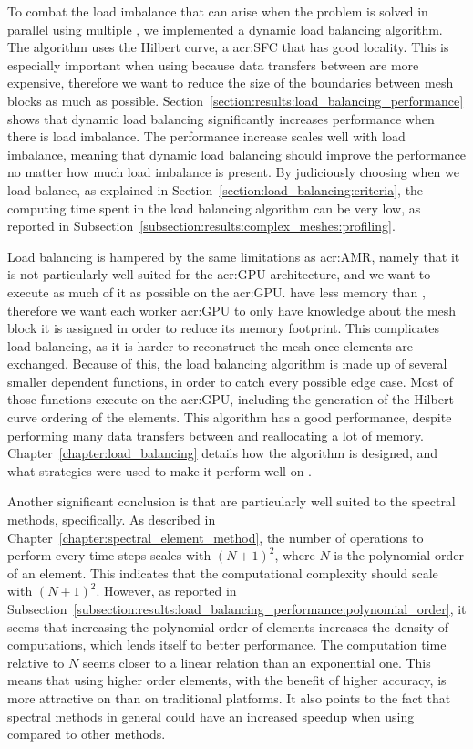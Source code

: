 To combat the load imbalance that can arise when the problem is solved in parallel using multiple
, we implemented a dynamic load balancing algorithm. The algorithm uses the
Hilbert curve, a \acrlong{acr:SFC} that has good locality. This is especially important when using
 because data transfers between  are more expensive,
therefore we want to reduce the size of the boundaries between mesh blocks as much as possible.
Section~\ref{section:results:load_balancing_performance} shows that dynamic load balancing
significantly increases performance when there is load imbalance. The performance increase scales
well with load imbalance, meaning that dynamic load balancing should improve the performance no
matter how much load imbalance is present. By judiciously choosing when we load balance, as
explained in Section~\ref{section:load_balancing:criteria}, the computing time spent in the load
balancing algorithm can be very low, as reported in
Subsection~\ref{subsection:results:complex_meshes:profiling}. 

Load balancing is hampered  by the same limitations as \acrshort{acr:AMR}, namely that it is not
particularly well suited for the \acrshort{acr:GPU} architecture, and we want to execute as much of
it as possible on the \acrshort{acr:GPU}.  have less memory than
, therefore we want each worker \acrshort{acr:GPU} to only have knowledge about
the mesh block it is assigned in order to reduce its memory footprint. This complicates load
balancing, as it is harder to reconstruct the mesh once elements are exchanged. Because of this, the
load balancing algorithm is made up of several smaller dependent functions, in order to catch every
possible edge case. Most of those functions execute on the \acrshort{acr:GPU}, including the
generation of the Hilbert curve ordering of the elements. This algorithm has a good performance,
despite performing many data transfers between  and reallocating a lot of
memory. Chapter~\ref{chapter:load_balancing} details how the algorithm is designed, and what
strategies were used to make it perform well on .

Another significant conclusion is that  are particularly well suited to the
spectral methods, specifically. As described in Chapter~\ref{chapter:spectral_element_method}, the
number of operations to perform every time steps scales with \({\left( N + 1 \right)}^2\), where
\(N\) is the polynomial order of an element. This indicates that the computational complexity should
scale with \({\left( N + 1 \right)}^2\). However, as reported in
Subsection~\ref{subsection:results:load_balancing_performance:polynomial_order}, it seems that
increasing the polynomial order of elements increases the density of computations, which lends
itself to better performance. The computation time relative to \(N\) seems closer to a linear
relation than an exponential one. This means that using higher order elements, with the benefit of
higher accuracy, is more attractive on  than on traditional platforms. It also
points to the fact that spectral methods in general could have an increased speedup when using
 compared to other methods.

